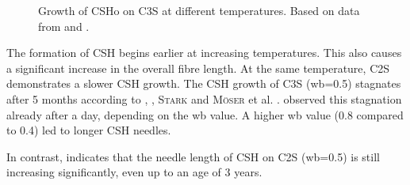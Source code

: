 \begin{figure}[!htb]
    \caption{Growth of \ac{CSHo} on \ac{C3S} at different temperatures. Based on data from \textcite{voland.2000} and \textcite{suss.2001}.}
    \label{fig:suess_CSH_C3S}
\end{figure}

The formation of \ac{CSH} begins earlier at increasing temperatures.
This also causes a significant increase in the overall fibre length.
At the same temperature, \ac{C2S} demonstrates a slower \ac{CSH} growth.
The \ac{CSH} growth of \ac{C3S} (\ac{wb}=\num{0.5}) stagnates after 5 months according to \textcite{voland.2000}, \textcite{suss.2001}, \textsc{Stark} and \textsc{Möser} et al. \cite{stark.2001,moser.2002}.
\textcite{bazzoni.2014} observed this stagnation already after a day, depending on the \ac{wb} value.
A higher \ac{wb} value (\num{0.8} compared to \num{0.4}) led to longer \ac{CSH} needles.

In contrast, \textcite{moser.2002} indicates that the needle length of \ac{CSH} on \ac{C2S} (\ac{wb}=\num{0.5}) is still increasing significantly, even up to an age of \num{3} years.


